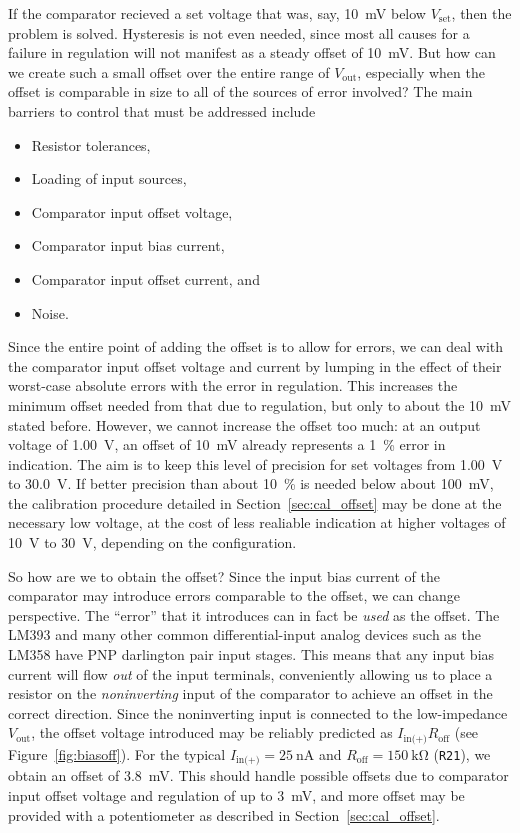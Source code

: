 \documentclass[letterpaper,twocolumn,10pt]{article}
\newcommand{\refdes}[1]{\texttt{#1}}
\begin{document}
If the comparator recieved a set voltage that was, say, \SI{10}{\mV} below
$V_\text{set}$, then the problem is solved. Hysteresis is not even needed, since
most all causes for a failure in regulation will not manifest as a steady offset
of \SI{10}{\mV}. But how can we create such a small offset over the entire range
of $V_\text{out}$, especially when the offset is comparable in size to all of
the sources of error involved? The main barriers to control that must be
addressed include
\begin{itemize}
  \item Resistor tolerances,
  \item Loading of input sources,
  \item Comparator input offset voltage,
  \item Comparator input bias current,
  \item Comparator input offset current, and
  \item Noise.
\end{itemize}

Since the entire point of adding the offset is to allow for errors, we can deal
with the comparator input offset voltage and current by lumping in the effect of
their worst-case absolute errors with the error in regulation. This increases
the minimum offset needed from that due to regulation, but only to about the
\SI{10}{\mV} stated before. However, we cannot increase the offset too much: at
an output voltage of \SI{1.00}{\V}, an offset of \SI{10}{\mV} already represents
a \SI{1}{\percent} error in indication. The aim is to keep this level of
precision for set voltages from \SI{1.00}{\V} to \SI{30.0}{\V}. If better
precision than about \SI{10}{\percent} is needed below about \SI{100}{\mV}, the
calibration procedure detailed in Section~\ref{sec:cal_offset} may be done at
the necessary low voltage, at the cost of less realiable indication at higher
voltages of \SI{10}{\V} to \SI{30}{\V}, depending on the configuration.

So how are we to obtain the offset? Since the input bias current of the
comparator may introduce errors comparable to the offset, we can change
perspective. The ``error'' that it introduces can in fact be \emph{used} as the
offset. The LM393 and many other common differential-input analog devices such
as the LM358 have PNP darlington pair input stages. This means that any input
bias current will flow \emph{out} of the input terminals, conveniently allowing
us to place a resistor on the \emph{noninverting} input of the comparator to
achieve an offset in the correct direction. Since the noninverting input is
connected to the low-impedance $V_\text{out}$, the offset voltage introduced may
be reliably predicted as $I_\text{in(+)} R_\text{off}$ (see
Figure~\ref{fig:biasoff}). For the typical $I_\text{in(+)} = \SI{25}{\nA}$ and
$R_\text{off} = \SI{150}{\kohm}$ (\refdes{R21}), we obtain an offset of
\SI{3.8}{\mV}. This should handle possible offsets due to comparator input
offset voltage and regulation of up to \SI{3}{\mV}, and more offset may be
provided with a potentiometer as described in Section~\ref{sec:cal_offset}.
\end{document}

